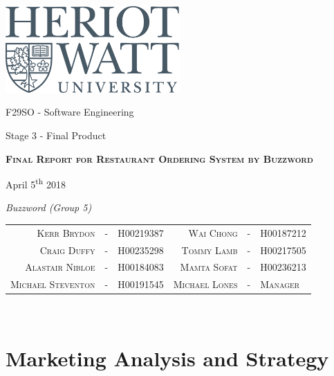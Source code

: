 \documentclass[11pt, oneside, a4paper]{report}   %
\begin{document}
\begin{titlepage}
	\thispagestyle{empty}
	{\centering
		\includegraphics[width=0.5\textwidth]{heriot-watt-logo.png}\par\vspace{1cm}
		\vspace{1cm}
		{\LARGE F29SO - Software Engineering\par}
		{\LARGE Stage 3 - Final Product\par}
		\vspace{1.5cm}
		\vspace{1.5cm}
		{\scshape\LARGE\bfseries Final Report for Restaurant Ordering System by Buzzword \par}

		\vspace{3.5cm}
			\begin{center}
					April 5\textsuperscript{th} 2018
			\end{center}
		\vspace{1cm}
		\textit{Buzzword (Group 5)}\par
		\begin{tabulary}{\textwidth}{rcl|rcl}
			\\ \textsc{Kerr Brydon} & - & H00219387&
			\textsc{Wai Chong} & - & H00187212\\
			\textsc{Craig Duffy} & - & H00235298 &
			\textsc{Tommy Lamb} & - & H00217505 \\
			\textsc{Alastair Nibloe} & - & H00184083&
			\textsc{Mamta Sofat} & - & H00236213\\
			\textsc{Michael Steventon} & - & H00191545&
			\textsc{Michael Lones} & - & \textsc{Manager} \\
		\end{tabulary} \\
	
	}
\end{titlepage}

\dominitoc %
\tableofcontents
\pagebreak
\chapter{Marketing Analysis and Strategy}
\pagebreak
\pagebreak
\minitoc
\pagebreak
\end{document}
